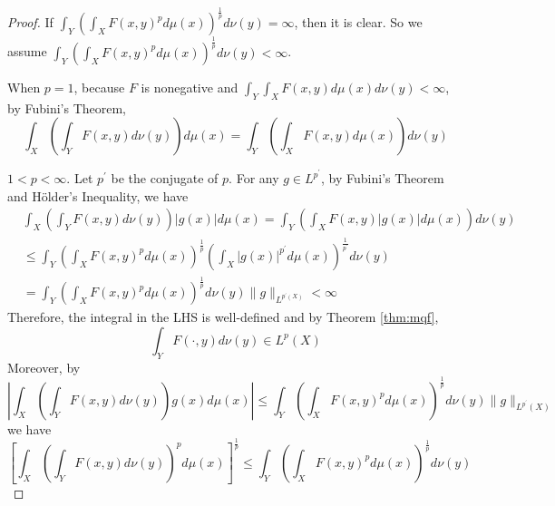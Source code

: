 \begin{proof}
	If $\int_Y\left(\int_X F(x, y)^p d \mu(x)\right)^{\frac{1}{p}} d \nu(y)=\infty$, then it is clear. So we assume $\int_Y\left(\int_X F(x, y)^p d \mu(x)\right)^{\frac{1}{p}} d \nu(y) < \infty$.

	\noindent When $p = 1$, because $F$ is nonegative and $\int_Y\int_X F(x, y) d \mu(x) d \nu(y) < \infty$, by Fubini's Theorem,
	\begin{equation*}
		\int_X\left(\int_Y F(x, y) d \nu(y)\right) d \mu(x)=\int_Y\left(\int_X F(x, y) d \mu(x)\right) d \nu(y)
	\end{equation*}

	\noindent $1 < p <\infty$. Let $p^\prime$ be the conjugate of $p$. For any $g \in L^{p^\prime}$, by Fubini's Theorem and H\"older's Inequality, we have
	\begin{equation*}
		\begin{aligned}
			& \int_X\left(\int_Y F(x, y) d \nu(y)\right)|g(x)| d \mu(x)=\int_Y\left(\int_X F(x, y)|g(x)| d \mu(x)\right) d \nu(y) \\
			& \leq \int_Y\left(\int_X F(x, y)^p d \mu(x)\right)^{\frac{1}{p}}\left(\int_X|g(x)|^{p^{\prime}} d \mu(x)\right)^{\frac{1}{p^{\prime}}} d \nu(y) \\
			& =\int_Y\left(\int_X F(x, y)^p d \mu(x)\right)^{\frac{1}{p}} d \nu(y)\|g\|_{L^{p^{\prime}(X)}}<\infty
		\end{aligned}
	\end{equation*}
	Therefore, the integral in the LHS is well-defined and by Theorem \ref{thm:mqf},
	\begin{equation*}
		\int_Y F(\cdot, y) d \nu(y) \in L^p(X)
	\end{equation*}
	Moreover, by
	\begin{equation*}
		\left|\int_X\left(\int_Y F(x, y) d \nu(y)\right) g(x) d \mu(x)\right| \leq \int_Y\left(\int_X F(x, y)^p d \mu(x)\right)^{\frac{1}{p}} d \nu(y)\|g\|_{L^{p^{\prime}}(X)}
	\end{equation*}
	we have
	\begin{equation*}
		\left[\int_X\left(\int_Y F(x, y) d \nu(y)\right)^p d \mu(x)\right]^{\frac{1}{p}} \leq \int_Y\left(\int_X F(x, y)^p d \mu(x)\right)^{\frac{1}{p}} d \nu(y)
	\end{equation*}
\end{proof}

